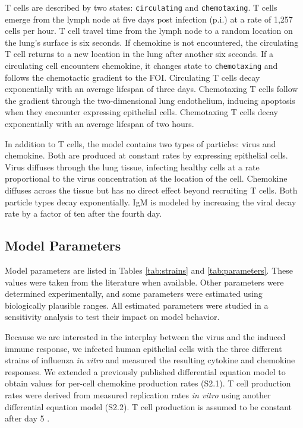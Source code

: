 \documentclass[10pt]{article}
\begin{document}
T cells are described by two states: \texttt{circulating} and \texttt{chemotaxing}.    T cells emerge from the lymph node at five days post infection (p.i.) at a rate of 1,257 cells per hour. T cell travel time from the lymph node to a random location on the lung's surface is six seconds.  If chemokine is not encountered, the circulating T cell returns to a new location in the lung after another six seconds.  If a circulating cell encounters chemokine, it changes state to \texttt{chemotaxing} and follows the chemotactic gradient to the FOI. Circulating T cells decay exponentially with an average lifespan of three days.  Chemotaxing T cells follow the gradient through the two-dimensional lung endothelium, inducing apoptosis when they encounter expressing epithelial cells. Chemotaxing T cells decay exponentially with an average lifespan of two hours.

In addition to T cells, the model contains two types of particles: virus and chemokine. Both are produced at constant rates by expressing epithelial cells.  Virus diffuses through the lung tissue, infecting healthy cells at a rate proportional to the virus concentration at the location of the cell. Chemokine diffuses across the tissue but has no direct effect beyond recruiting T cells. Both particle types decay exponentially.  IgM is modeled by increasing the viral decay rate by a factor of ten after the fourth day.


\subsection*{Model Parameters}

Model parameters are listed in Tables \ref{tab:strains} and \ref{tab:parameters}. These values were taken from the literature when available.  Other parameters were determined experimentally, and some parameters were estimated using biologically plausible ranges.  All estimated parameters were studied in a sensitivity analysis to test their impact on model behavior. 

Because we are interested in the interplay between the virus and the induced immune response, we infected human epithelial cells with the three different strains of influenza \textit{in vitro} and measured the resulting cytokine and chemokine responses.  We extended a previously published differential equation model \cite{Mitchell2011} to obtain values for per-cell chemokine production rates (S2.1).  T cell production rates were derived from measured replication rates \textit{in vitro} \cite{Miao2010} using another differential equation model (S2.2). T cell production is assumed to be constant after day 5 \cite{MartIn-Fontecha2003}.  
\end{document}

